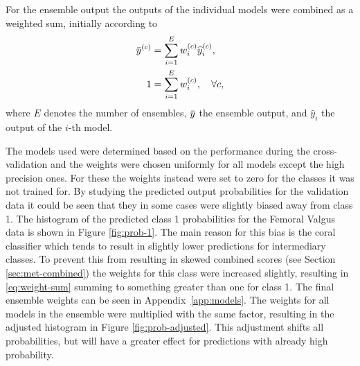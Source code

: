 For the ensemble output the outputs of the individual models were combined as a weighted sum, initially according to
\begin{subequations}
\begin{align}
      \mybar[0.7][1pt]{y}^{(c)} &= \sum_{i=1}^E w_i^{(c)} \widehat{y}_i^{(c)}, \\
      1 &= \sum_{i=1}^E w_i^{(c)}, \quad \forall c, \label{eq:weight-sum}
\end{align}
\end{subequations}
where $E$ denotes the number of ensembles, $\mybar[0.7][1pt]{y}$ the ensemble output, and $\widehat{y}_i$ the output of the $i$-th model.

The models used were determined based on the performance during the cross-validation and the weights were chosen uniformly for all models except the high precision ones. For these the weights instead were set to zero for the classes it was not trained for. By studying the predicted output probabilities for the validation data it could be seen that they in some cases were slightly biased away from class 1. The histogram of the predicted class 1 probabilities for the Femoral Valgus data is shown in Figure \ref{fig:prob-1}. The main reason for this bias is the \gls{coral} classifier which tends to result in slightly lower predictions for intermediary classes. To prevent this from resulting in skewed combined scores (see Section \ref{sec:met-combined}) the weights for this class were increased slightly, resulting in \eqref{eq:weight-sum} summing to something greater than one for class 1. The final ensemble weights can be seen in Appendix~\ref{app:models}. The weights for all models in the ensemble were multiplied with the same factor, resulting in the adjusted histogram in Figure \ref{fig:prob-adjusted}. This adjustment shifts all probabilities, but will have a greater effect for predictions with already high probability.

